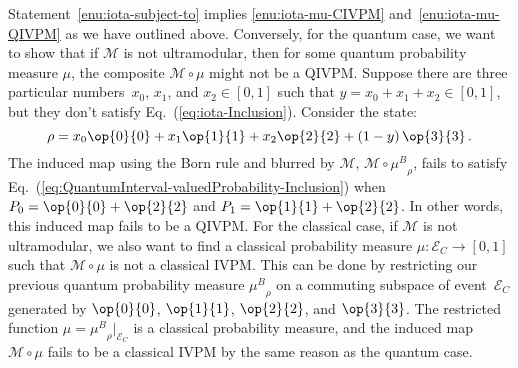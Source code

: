\documentclass[english,reprint, aps, prl,superscriptaddress, showpacs,
showkeys, longbibliography, amsmath, amssymb, floatfix]{revtex4-1}
\theoremstyle{plain}
\theoremstyle{definition}
\newcommand{\events}{\ensuremath{\mathcal{E}}}
\newcommand{\proj}[1]{\op{#1}{#1}}
\newcommand{\ultramodular}{\mathcal{M}}
\newcommand{\muB}{\ensuremath{\mu^{B}}}
\newcommand{\eventsC}{\ensuremath{\events_{C}}}
\begin{document}
Statement~\ref{enu:iota-subject-to} implies \ref{enu:iota-mu-CIVPM}
and~\ref{enu:iota-mu-QIVPM} as we have outlined above. Conversely, for the quantum case, we want
to show that if $\ultramodular$ is not ultramodular, then for
some quantum probability measure $\mu$, the composite
$\ultramodular\circ\mu$ might not be a QIVPM. Suppose there are three
particular numbers~$x_{0}$, $x_{1}$, and $x_{2}\in\left[0,1\right]$
such that $y=x_{0}+x_{1}+x_{2}\in\left[0,1\right]$, but they don't
satisfy Eq.~(\ref{eq:iota-Inclusion}). Consider the state:
\[
\rho=x_{0}\proj{0}+x_{1}\proj{1}+x_{2}\proj{2}+\left(1-y\right)\proj{3}\,.
\]
The induced map using the Born rule and blurred by $\ultramodular$,
$\ultramodular\circ\muB_{\rho}$, fails to satisfy
Eq.~(\ref{eq:QuantumInterval-valuedProbability-Inclusion}) when
$P_{0}=\proj{0}+\proj{2}$ and $P_{1}=\proj{1}+\proj{2}$. In other
words, this induced map fails to be a QIVPM. For the classical case, if
$\ultramodular$ is not ultramodular, we also want to find a classical
probability measure $\mu:\eventsC\rightarrow\left[0,1\right]$ such
that $\ultramodular\circ\mu$ is not a classical IVPM. This can be
done by restricting our previous quantum probability measure
$\muB_{\rho}$ on a commuting subspace of
event~$\eventsC$ generated by $\proj{0}$, $\proj{1}$, $\proj{2}$,
and $\proj{3}$. The restricted function
$\mu=\muB_{\rho}|_{\eventsC}$ is a classical probability
measure, and the induced map $\ultramodular\circ\mu$ fails to be
a classical IVPM by the same reason as the quantum case.

\end{document}
